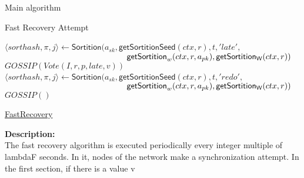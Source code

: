 \documentclass[10pt,a4paper]{article}
\begin{document}
\begin{section}{Main algorithm}
\begin{subsection}{Fast Recovery Attempt}
\begin{algorithm}[H]
\begin{algorithmic}[1]
                \State $\langle sorthash, \pi, j\rangle\gets 
                \mathsf{Sortition}(
                a_{sk}, 
                \mathsf{getSortitionSeed}(ctx, r), 
                t, 
                'late', $ \newline
                ${}$ ${\hskip 5.2cm}\mathsf{getSortition}_w(ctx, r, a_{pk}), 
                \mathsf{getSortition_W}(ctx, r)
                )$
                    \State $GOSSIP(Vote(I, r, p, late, v))$
                \EndIf
                    \State $\langle sorthash, \pi, j\rangle\gets 
                    \mathsf{Sortition}(
                    a_{sk}, 
                    \mathsf{getSortitionSeed}(ctx, r), 
                    t, 
                    'redo', $ \newline
                    ${}$ ${\hskip 5.2cm}\mathsf{getSortition}_w(ctx, r, a_{pk}), 
                    \mathsf{getSortition_W}(ctx, r)
                    )$
                        \State $GOSSIP()$
                    \EndIf
            \Else
                
            \EndIf    
        \EndFor


        \EndFunction
        \end{algorithmic}
        \caption{\underline{FastRecovery}}
    \end{algorithm}
    
    
    \noindent \textbf{Description:}\\
    The fast recovery algorithm is executed periodically every integer multiple of lambdaF
    seconds. In it, nodes of the network make a synchronization attempt.
    In the first section, if there is a value v 
\end{subsection}


\end{section}
\end{document}
